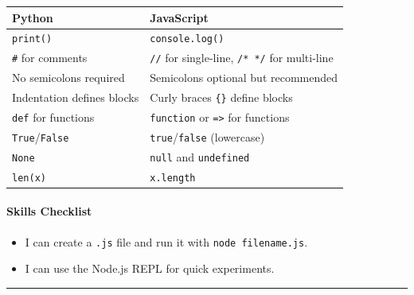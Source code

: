 \documentclass[
  justified,
  openright,
]{tufte-book}
\let\subsection\paragraph
\let\paragraph\paragraph
\let\subsection\paragraph
\let\paragraph\paragraph
\providecommand{\tightlist}{%
  \setlength{\itemsep}{0pt}\setlength{\parskip}{0pt}}
\begin{document}
\begin{fullwidth}{\def\LTcaptype{none} %
\begin{longtable}[]{@{}
  >{\raggedright\arraybackslash}p{}
  >{\raggedright\arraybackslash}p{}@{}}
\toprule\noalign{}
\begin{minipage}[b]{\linewidth}\raggedright
Python
\end{minipage} & \begin{minipage}[b]{\linewidth}\raggedright
JavaScript
\end{minipage} \\
\midrule\noalign{}
\endhead
\bottomrule\noalign{}
\endlastfoot
\texttt{print()} & \texttt{console.log()} \\
\texttt{\#} for comments & \texttt{//} for single-line, \texttt{/*\ */}
for multi-line \\
No semicolons required & Semicolons optional but recommended \\
Indentation defines blocks & Curly braces \texttt{\{\}} define blocks \\
\texttt{def} for functions & \texttt{function} or
\texttt{=\textgreater{}} for functions \\
\texttt{True}/\texttt{False} & \texttt{true}/\texttt{false}
(lowercase) \\
\texttt{None} & \texttt{null} and \texttt{undefined} \\
\texttt{len(x)} & \texttt{x.length} \\
\end{longtable}
}
\end{fullwidth}

\subsection{Skills Checklist}\label{skills-checklist-53}

\begin{itemize}
\tightlist
\item[$\square$]
  I can create a \texttt{.js} file and run it with
  \texttt{node\ filename.js}.
\item[$\square$]
  I can use the Node.js REPL for quick experiments.
\end{itemize}

\begin{center}\rule{0.5\linewidth}{0.5pt}\end{center}
\end{document}
